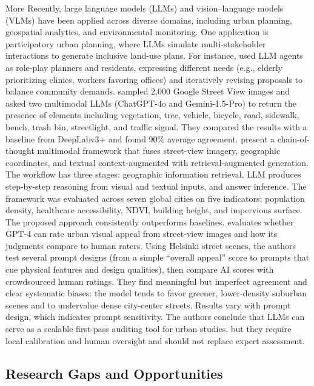 \documentclass[11pt]{article}
\begin{document}
More Recently, large language models (LLMs) and vision–language models (VLMs) have been applied across diverse domains, including urban planning, geospatial analytics, and environmental monitoring. One  application is participatory urban planning, where LLMs simulate multi-stakeholder interactions to generate inclusive land-use plans. For instance, \citet {zhou2024large} used LLM agents as role-play planners and residents, expressing different needs (e.g., elderly prioritizing clinics, workers favoring offices) and iteratively revising proposals to balance community demands. \citet{jang2025multimodal} sampled 2,000 Google Street View images and asked two multimodal LLMs (ChatGPT-4o and Gemini-1.5-Pro) to return the presence of elements including vegetation, tree, vehicle, bicycle, road, sidewalk, bench, trash bin, streetlight, and traffic signal. They compared the results with a baseline from DeepLabv3+ and found  90\% average agreement. \citet{li2024streetviewllm} present a chain-of-thought multimodal framework that fuses street-view imagery, geographic coordinates, and textual context-augmented with retrieval-augmented generation. The workflow has three stages: geographic information retrieval, LLM produces step-by-step reasoning from visual and textual inputs, and answer inference. The framework was evaluated across seven global cities on five indicators: population density, healthcare accessibility, NDVI, building height, and impervious surface. The proposed  approach consistently outperforms baselines. \citet{malekzadehUrbanVisualAppeal} evaluates whether GPT-4 can rate urban visual appeal from street-view images and how its judgments compare to human raters. Using Helsinki street scenes, the authors test several prompt designs (from a simple “overall appeal” score to prompts that cue physical features and design qualities), then compare AI scores with crowdsourced human ratings. They find meaningful but imperfect agreement and clear systematic biases: the model tends to favor greener, lower-density suburban scenes and to undervalue dense city-center streets. Results vary with prompt design, which indicates prompt sensitivity. The authors conclude that LLMs can serve as a scalable first-pass auditing tool for urban studies, but they require local calibration and human oversight and should not replace expert assessment.

\subsection{Research Gaps and Opportunities}
\end{document}
